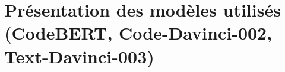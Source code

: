 \chapter{Présentation des modèles utilisés (CodeBERT, Code-Davinci-002, Text-Davinci-003)}
    \section{}
        \subsection{}
            \subsubsection{}